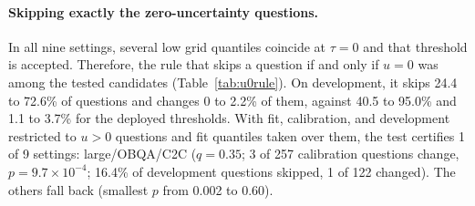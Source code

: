 \paragraph{Skipping exactly the zero-uncertainty questions.} In all nine settings, several low grid quantiles coincide at $\tau=0$ and that threshold is accepted. Therefore, the rule that skips a question if and only if $u=0$ was among the tested candidates (Table~\ref{tab:u0rule}). On development, it skips 24.4 to 72.6\% of questions and changes 0 to 2.2\% of them, against 40.5 to 95.0\% and 1.1 to 3.7\% for the deployed thresholds. With fit, calibration, and development restricted to $u>0$ questions and fit quantiles taken over them, the test certifies 1 of 9 settings: large/OBQA/C2C ($q=0.35$; 3 of 257 calibration questions change, $p=9.7\times10^{-4}$; 16.4\% of development questions skipped, 1 of 122 changed). The others fall back (smallest $p$ from 0.002 to 0.60).

